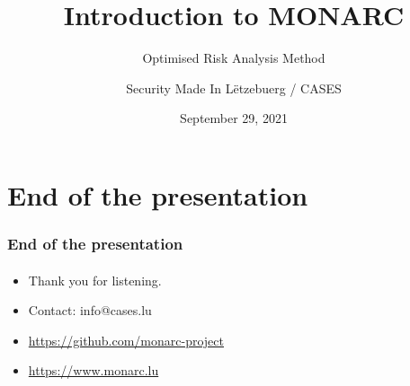 \documentclass[]{beamer}
\title[Introduction to MONARC]{Introduction to MONARC}
\subtitle{Optimised Risk Analysis Method}
\author[Team CASES]{Security Made In Lëtzebuerg / CASES}
\institute[]{\href{https://www.cases.lu}{Cyberworld Awareness and Security Enhancements Services}}
\date{September 29, 2021}
\begin{document}
\begin{frame}
    \titlepage
\end{frame}





% 
% 



%
%
\section*{End of the presentation}
\begin{frame}
    \frametitle{End of the presentation}
    \framesubtitle{}
    \begin{center}
        \begin{itemize}
            \item Thank you for listening.
            \item Contact: info@cases.lu
            \item \url{https://github.com/monarc-project}
            \item \url{https://www.monarc.lu}
        \end{itemize}
    \end{center}
\end{frame}
\end{document}
